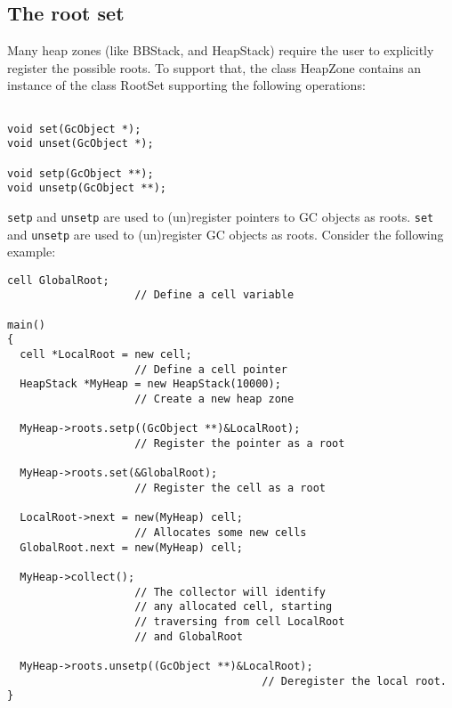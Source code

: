 \subsection{The root set}

Many heap zones (like BBStack, and HeapStack) require the user to explicitly
register the possible roots.
To support that, the class HeapZone contains an instance of the class RootSet
supporting the following operations:

\begin{verbatim}

void set(GcObject *);
void unset(GcObject *);

void setp(GcObject **);
void unsetp(GcObject **);
\end{verbatim}

\verb|setp| and \verb|unsetp| are used to (un)register pointers
to GC objects as roots.
\verb|set| and \verb|unsetp| are used to (un)register GC objects
as roots.
Consider the following example:

\begin{verbatim}
cell GlobalRoot;			    
					// Define a cell variable

main()
{
  cell *LocalRoot = new cell;		    
					// Define a cell pointer
  HeapStack *MyHeap = new HeapStack(10000); 
					// Create a new heap zone

  MyHeap->roots.setp((GcObject **)&LocalRoot);  
					// Register the pointer as a root

  MyHeap->roots.set(&GlobalRoot);           
					// Register the cell as a root

  LocalRoot->next = new(MyHeap) cell;	
					// Allocates some new cells
  GlobalRoot.next = new(MyHeap) cell;

  MyHeap->collect();			    
					// The collector will identify
					// any allocated cell, starting
					// traversing from cell LocalRoot
					// and GlobalRoot

  MyHeap->roots.unsetp((GcObject **)&LocalRoot);
                                        // Deregister the local root.
}
\end{verbatim}

